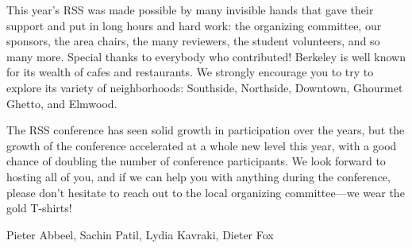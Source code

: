 This year’s RSS was made possible by many invisible hands that gave their support and put in long hours and hard work: the organizing committee, our sponsors, the area chairs, the many reviewers, the student volunteers, and so many more.  Special thanks to everybody who contributed!
Berkeley is well known for its wealth of cafes and restaurants.  We strongly encourage you to try to explore its variety of neighborhoods: Southside, Northside, Downtown, Ghourmet Ghetto, and Elmwood.

\vspace{1mm}

The RSS conference has seen solid growth in participation over the years, but the growth of the conference accelerated at a whole new level this year, with a good chance of doubling the number of conference participants.  We look forward to hosting all of you, and if we can help you with anything during the conference, please don’t hesitate to reach out to the local organizing committee—we wear the gold T-shirts!  

\vspace{1cm}

Pieter Abbeel, Sachin Patil, Lydia Kavraki, Dieter Fox
%
\endgroup{}
\normalsize

